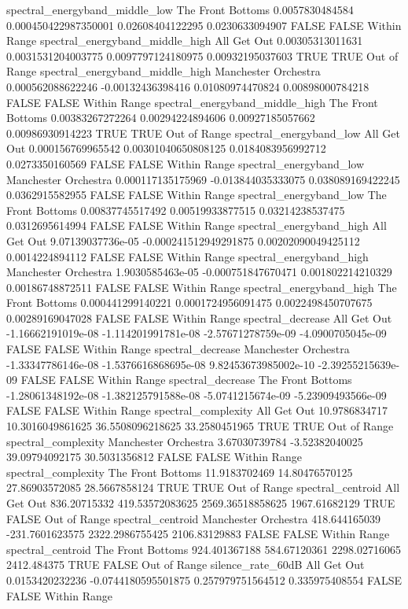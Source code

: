 spectral_energyband_middle_low The Front Bottoms 0.0057830484584 0.000450422987350001 0.02608404122295 0.0230633094907 FALSE FALSE Within Range
spectral_energyband_middle_high All Get Out 0.00305313011631 0.0031531204003775 0.0097797124180975 0.00932195037603 TRUE TRUE Out of Range
spectral_energyband_middle_high Manchester Orchestra 0.000562088622246 -0.00132436398416 0.01080974470824 0.00898000784218 FALSE FALSE Within Range
spectral_energyband_middle_high The Front Bottoms 0.00383267272264 0.00294224894606 0.00927185057662 0.00986930914223 TRUE TRUE Out of Range
spectral_energyband_low All Get Out 0.000156769965542 0.00301040650808125 0.0184083956992712 0.0273350160569 FALSE FALSE Within Range
spectral_energyband_low Manchester Orchestra 0.000117135175969 -0.013844035333075 0.038089169422245 0.0362915582955 FALSE FALSE Within Range
spectral_energyband_low The Front Bottoms 0.00837745517492 0.00519933877515 0.03214238537475 0.0312695614994 FALSE FALSE Within Range
spectral_energyband_high All Get Out 9.07139037736e-05 -0.000241512949291875 0.00202090049425112 0.0014224894112 FALSE FALSE Within Range
spectral_energyband_high Manchester Orchestra 1.9030585463e-05 -0.000751847670471 0.001802214210329 0.00186748872511 FALSE FALSE Within Range
spectral_energyband_high The Front Bottoms 0.000441299140221 0.0001724956091475 0.0022498450707675 0.00289169047028 FALSE FALSE Within Range
spectral_decrease All Get Out -1.16662191019e-08 -1.114201991781e-08 -2.57671278759e-09 -4.0900705045e-09 FALSE FALSE Within Range
spectral_decrease Manchester Orchestra -1.33347786146e-08 -1.5376616868695e-08 9.82453673985002e-10 -2.39255215639e-09 FALSE FALSE Within Range
spectral_decrease The Front Bottoms -1.28061348192e-08 -1.382125791588e-08 -5.0741215674e-09 -5.23909493566e-09 FALSE FALSE Within Range
spectral_complexity All Get Out 10.9786834717 10.3016049861625 36.5508096218625 33.2580451965 TRUE TRUE Out of Range
spectral_complexity Manchester Orchestra 3.67030739784 -3.52382040025 39.09794092175 30.5031356812 FALSE FALSE Within Range
spectral_complexity The Front Bottoms 11.9183702469 14.80476570125 27.86903572085 28.5667858124 TRUE TRUE Out of Range
spectral_centroid All Get Out 836.20715332 419.53572083625 2569.36518858625 1967.61682129 TRUE FALSE Out of Range
spectral_centroid Manchester Orchestra 418.644165039 -231.7601623575 2322.2986755425 2106.83129883 FALSE FALSE Within Range
spectral_centroid The Front Bottoms 924.401367188 584.67120361 2298.02716065 2412.484375 TRUE FALSE Out of Range
silence_rate_60dB All Get Out 0.0153420232236 -0.0744180595501875 0.257979751564512 0.335975408554 FALSE FALSE Within Range
